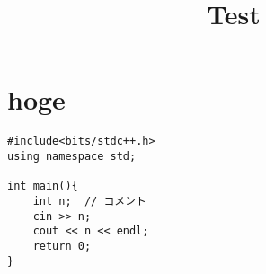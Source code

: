 \documentclass[12pt,a4paper,dvipdfmx]{jsarticle}
\title{Test}
\author{}
\date{}
\begin{document}
\maketitle

\section{hoge}

\begin{lstlisting}
#include<bits/stdc++.h>
using namespace std;

int main(){
    int n;  // コメント
    cin >> n;
    cout << n << endl;
    return 0;
}
\end{lstlisting}
\end{document}
